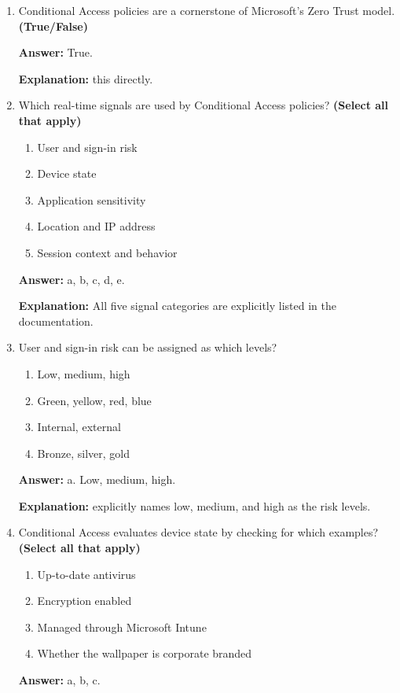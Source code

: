 \documentclass[10pt]{article}
\begin{document}
\begin{enumerate}[leftmargin=*]
\textbf{Answer:} True.

\textbf{Explanation:} This is the exact definition given at the start of the Conditional Access section.

\item Conditional Access policies are a cornerstone of Microsoft’s Zero Trust model. \textbf{(True/False)}

\textbf{Answer:} True.

\textbf{Explanation:} this directly.

\item Which real-time signals are used by Conditional Access policies? \textbf{(Select all that apply)}
\begin{enumerate}[label=\alph*., leftmargin=1.5em]
\item User and sign-in risk
\item Device state
\item Application sensitivity
\item Location and IP address
\item Session context and behavior
\end{enumerate}
\textbf{Answer:} a, b, c, d, e.

\textbf{Explanation:} All five signal categories are explicitly listed in the documentation.

\item User and sign-in risk can be assigned as which levels?
\begin{enumerate}[label=\alph*., leftmargin=1.5em]
\item Low, medium, high
\item Green, yellow, red, blue
\item Internal, external
\item Bronze, silver, gold
\end{enumerate}
\textbf{Answer:} a. Low, medium, high.

\textbf{Explanation:} explicitly names low, medium, and high as the risk levels.

\item Conditional Access evaluates device state by checking for which examples? \textbf{(Select all that apply)}
\begin{enumerate}[label=\alph*., leftmargin=1.5em]
\item Up-to-date antivirus
\item Encryption enabled
\item Managed through Microsoft Intune
\item Whether the wallpaper is corporate branded
\end{enumerate}
\textbf{Answer:} a, b, c.


\end{enumerate}
\end{document}

